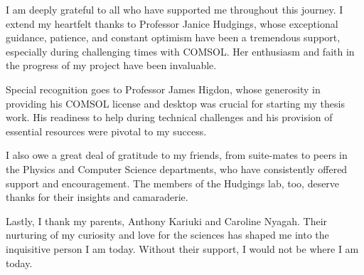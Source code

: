 I am deeply grateful to all who have supported me throughout this journey. I extend my heartfelt thanks to Professor Janice Hudgings, whose exceptional guidance, patience, and constant optimism have been a tremendous support, especially during challenging times with COMSOL. Her enthusiasm and faith in the progress of my project have been invaluable.

Special recognition goes to Professor James Higdon, whose generosity in providing his COMSOL license and desktop was crucial for starting my thesis work. His readiness to help during technical challenges and his provision of essential resources were pivotal to my success.

I also owe a great deal of gratitude to my friends, from suite-mates to peers in the Physics and Computer Science departments, who have consistently offered support and encouragement. The members of the Hudgings lab, too, deserve thanks for their insights and camaraderie.

Lastly, I thank my parents, Anthony Kariuki and Caroline Nyagah. Their nurturing of my curiosity and love for the sciences has shaped me into the inquisitive person I am today. Without their support, I would not be where I am today.
